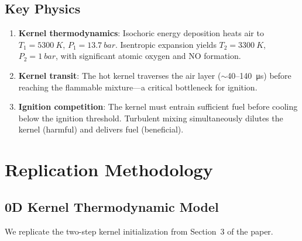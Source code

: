 \documentclass[11pt]{article}
\begin{document}
\subsection{Key Physics}
\begin{enumerate}
    \item \textbf{Kernel thermodynamics}: Isochoric energy deposition heats air to $T_1 = \SI{5300}{K}$, $P_1 = \SI{13.7}{bar}$. Isentropic expansion yields $T_2 = \SI{3300}{K}$, $P_2 = \SI{1}{bar}$, with significant atomic oxygen and NO formation.
    \item \textbf{Kernel transit}: The hot kernel traverses the air layer ($\sim$40--\SI{140}{\micro s}) before reaching the flammable mixture---a critical bottleneck for ignition.
    \item \textbf{Ignition competition}: The kernel must entrain sufficient fuel before cooling below the ignition threshold. Turbulent mixing simultaneously dilutes the kernel (harmful) and delivers fuel (beneficial).
\end{enumerate}

\section{Replication Methodology}

\subsection{0D Kernel Thermodynamic Model}
We replicate the two-step kernel initialization from Section~3 of the paper.
\end{document}
